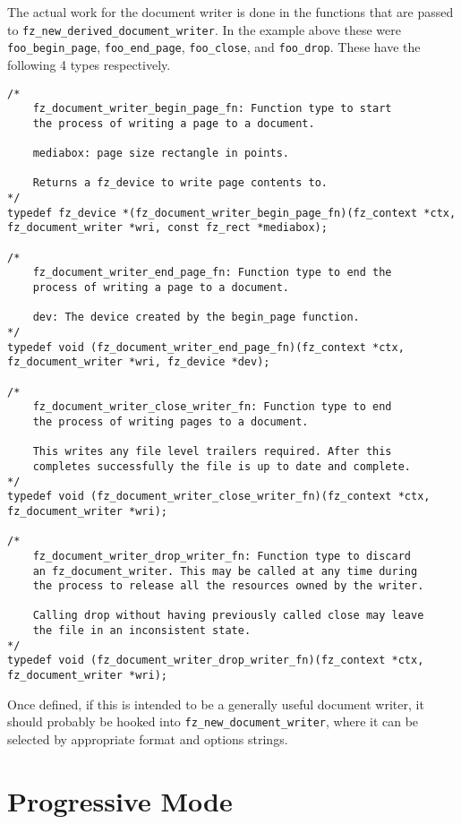 \documentclass[oneside]{book}
\begin{document}
The actual work for the document writer is done in the functions that are passed to \texttt{fz\_new\_derived\_document\_writer}. In the example above these were \texttt{foo\_begin\_page}, \texttt{foo\_end\_page}, \texttt{foo\_close}, and \texttt{foo\_drop}. These have the following 4 types respectively. 

\begin{lstlisting}
/*
	fz_document_writer_begin_page_fn: Function type to start
	the process of writing a page to a document.

	mediabox: page size rectangle in points.

	Returns a fz_device to write page contents to.
*/
typedef fz_device *(fz_document_writer_begin_page_fn)(fz_context *ctx, fz_document_writer *wri, const fz_rect *mediabox);

/*
	fz_document_writer_end_page_fn: Function type to end the
	process of writing a page to a document.

	dev: The device created by the begin_page function.
*/
typedef void (fz_document_writer_end_page_fn)(fz_context *ctx, fz_document_writer *wri, fz_device *dev);

/*
	fz_document_writer_close_writer_fn: Function type to end
	the process of writing pages to a document.

	This writes any file level trailers required. After this
	completes successfully the file is up to date and complete.
*/
typedef void (fz_document_writer_close_writer_fn)(fz_context *ctx, fz_document_writer *wri);

/*
	fz_document_writer_drop_writer_fn: Function type to discard
	an fz_document_writer. This may be called at any time during
	the process to release all the resources owned by the writer.

	Calling drop without having previously called close may leave
	the file in an inconsistent state.
*/
typedef void (fz_document_writer_drop_writer_fn)(fz_context *ctx, fz_document_writer *wri);
\end{lstlisting}

Once defined, if this is intended to be a generally useful document writer, it should probably be hooked into \texttt{fz\_new\_document\_writer}, where it can be selected by appropriate format and options strings.

\chapter{Progressive Mode}
\label{ProgressiveMode}
\end{document}
